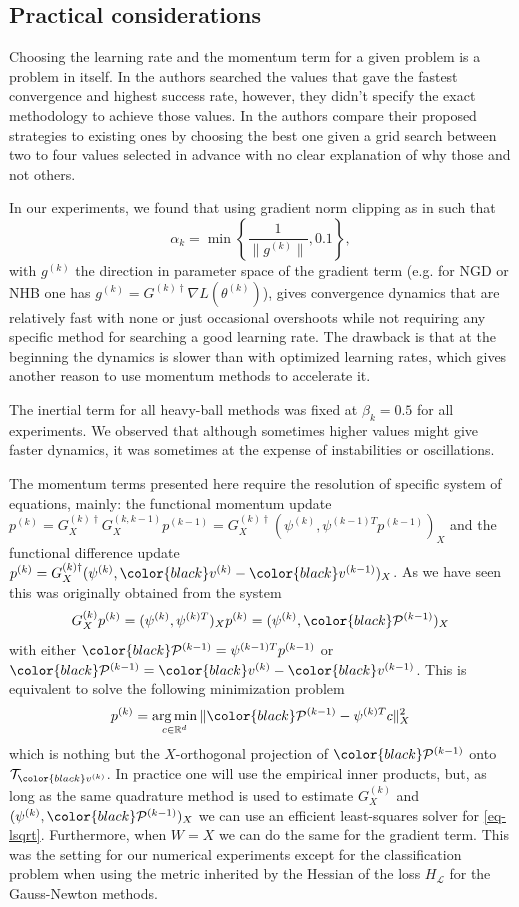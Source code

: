 \documentclass{article}
\theoremstyle{noparens}
\newcommand{\cL}{\mathcal{L}}
\newcommand{\cT}{\mathcal{T}}
\newcommand{\cP}{\mathcal{P}}
\newcommand{\R}{\mathbb{R}}
\DeclareMathOperator*{\argmin}{arg\,min}
\newcommand{\colorM}{\color{black}}
\newcommand{\colorT}{\color{black}}
\newcommand{\paramk}{\theta^{(k)}}
\newcommand{\vk}{{\colorM v^{(k)}}}
\newcommand{\vkm}{{\colorM v^{(k-1)}}}
\newcommand{\psik}{\psi^{(k)}}
\newcommand{\psikT}{\psi^{(k)T}}
\newcommand{\psikmT}{\psi^{(k-1)T}}
\newcommand{\pk}{p^{(k)}}
\newcommand{\pkm}{p^{(k-1)}}
\newcommand{\Pkm}{{\colorT \cP^{(k-1)}}}
\newcommand{\gk}{g^{(k)}}
\newcommand{\Ginvk}{{G^{(k)\dagger}}}
\newcommand{\GXk}{{G^{(k)}_X}}
\newcommand{\GXinvk}{{G^{(k)\dagger}_X}}
\newcommand{\GXkkm}{{G^{(k,k-1)}_X}}
\newcommand{\GradP}{\nabla}
\newcommand{\LossGrad}{\GradP L}
\begin{document}
 
\subsection{Practical considerations}

Choosing the learning rate and the momentum term for a given problem is a problem in itself. In \cite{parkAdaptiveNaturalGradient2000} the authors searched the values that gave the fastest convergence and highest success rate, however, they didn't specify the exact methodology to achieve those values. In \cite{liAcceleratedNaturalGradient2025} the authors compare their proposed strategies to existing ones by choosing the best one given a grid search between two to four values selected in advance with no clear explanation of why those and not others.

In our experiments, we found that using gradient norm clipping as in \cite{gradclipping2013} such that
$$\alpha_k=\min \left\{ \frac{1}{\| \gk \|}, 0.1 \right\},$$
with $\gk$ the direction in parameter space of the gradient term (e.g. for NGD or NHB one has $\gk=\Ginvk\LossGrad(\paramk)$),
gives convergence dynamics that are relatively fast with none or just occasional overshoots while not requiring any specific method for searching a good learning rate. The drawback is that at the beginning the dynamics is slower than with optimized learning rates, which gives another reason to use momentum methods to accelerate it.
\newline

The inertial term for all heavy-ball methods was fixed at $\beta_k=0.5$ for all experiments. We observed that although sometimes higher values might give faster dynamics, it was sometimes at the expense of instabilities or oscillations.
\newline



The momentum terms presented here require the resolution of specific system of equations, mainly: the functional momentum update $\pk=\GXinvk \GXkkm \pkm=\GXinvk ({\psik, \psikmT \pkm})_X$ and the functional difference update $\pk=\GXinvk ({\psik, \vk-\vkm})_X$. As we have seen this was originally obtained from the system
$$\GXk\pk = ({\psik, \psikT})_X\pk = ({\psik, \Pkm})_X$$
with either $\Pkm=\psikmT \pkm$ or $\Pkm=\vk-\vkm$. This is equivalent to solve the following minimization problem
\begin{equation}
\pk = \argmin_{c\in\R^d} \|\Pkm-\psikT c\|^2_X \label{eq-lsqrt}
\end{equation}
which is nothing but the $X$-orthogonal projection of $\Pkm$ onto $\cT_\vk$. In practice one will use the empirical inner products, but, as long as the same quadrature method is used to estimate $\GXk$ and $({\psik, \Pkm})_X$ we can use an efficient least-squares solver for \eqref{eq-lsqrt}. Furthermore, when $W=X$ we can do the same for the gradient term. This was the setting for our numerical experiments except for the classification problem when using the metric inherited by the Hessian of the loss $H_\cL$ for the Gauss-Newton methods.
\newline 
\end{document}
